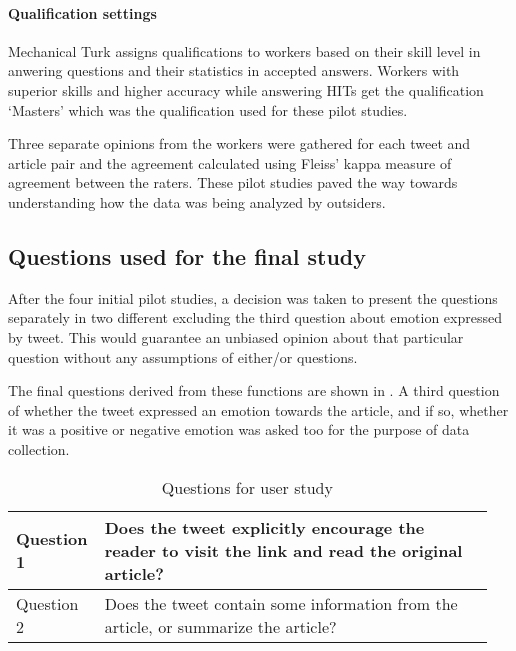 

\paragraph{Qualification settings} Mechanical Turk assigns qualifications to workers based on their skill level in anwering questions and their statistics in accepted answers. Workers with superior skills and higher accuracy while answering HITs get the qualification `Masters' which was the qualification used for these pilot studies.

Three separate opinions from the workers were gathered for each tweet and article pair and the agreement calculated using Fleiss' kappa measure  of agreement \citep{geertzen2012inter} between the raters. These pilot studies paved the way towards understanding how the data was being analyzed by outsiders. 
 
 


\subsection{Questions used for the final study}

After the four initial pilot studies, a decision was taken to present the questions separately in two different excluding the third question about emotion expressed by tweet. This would guarantee an unbiased opinion about that particular question without any assumptions of either/or questions.

The final questions derived from these functions are shown in . A third question of whether the tweet expressed an emotion towards the article, and if so, whether it was a positive or negative emotion was asked too for the purpose of data collection. 

\begin{table}[!htbp]
\centering
\begin{tabular}{|p{0.15\linewidth}|p{0.8\linewidth}|}
\hline
Question 1 & Does the tweet explicitly encourage the reader to visit the link and read the original article? \\ \hline
Question 2 & Does the tweet contain some information from the article, or summarize the article?             \\ \hline
\end{tabular}
\caption{Questions for user study}
\label{tab:mturkqs}
\end{table} 

